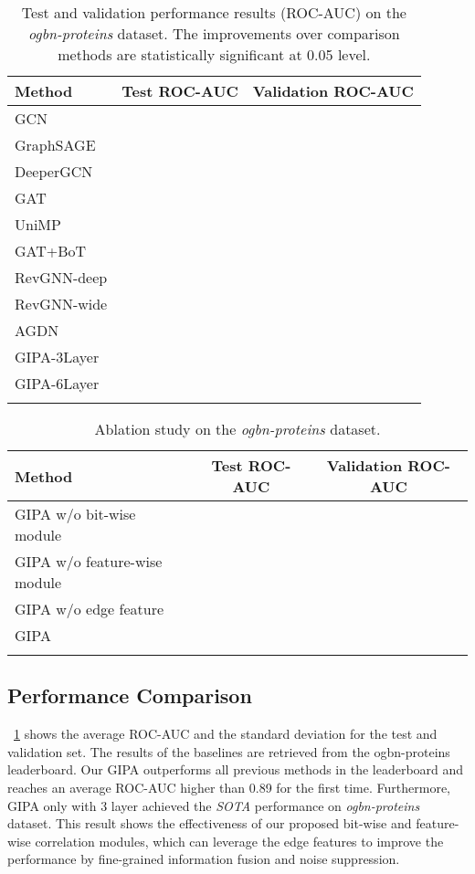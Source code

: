 \documentclass[runningheads]{llncs}
\newcommand{\model}{GIPA\xspace}
\begin{document}
\begin{table}[!h]
\centering
\caption{Test and validation performance results (ROC-AUC) on the \textit{ogbn-proteins} dataset. The improvements over comparison methods are statistically significant at 0.05 level.}
\begin{tabular}{lcc}
\hline
Method              & Test ROC-AUC  & Validation ROC-AUC \\ \hline
GCN                 &  &       \\
GraphSAGE           &  &       \\
DeeperGCN           &  &       \\
GAT                 &  &       \\
UniMP               &  &       \\
GAT+BoT  &  &       \\
RevGNN-deep &  &       \\
RevGNN-wide &  &       \\
AGDN &  &       \\
\hline
\model-3Layer &  &       \\
\model-6Layer      &  &       \\ \hline
\label{tab:performance}
\end{tabular}
\vspace{-0.7cm}
\end{table}
\begin{table}[!h]
\centering
\caption{Ablation study on the \textit{ogbn-proteins} dataset.}
\begin{tabular}{lcc}
\hline
Method              & Test ROC-AUC  & Validation ROC-AUC \\ \hline
\model w/o bit-wise module                 &  &       \\
\model w/o feature-wise module         &  &       \\
\model w/o edge feature           &  &       \\
\hline
\model         &  &       \\ \hline
\label{tab:ab_performance}
\end{tabular}
\vspace{-0.3cm}
\end{table}





\subsection{Performance Comparison}
\tablename~\ref{tab:performance} shows the average ROC-AUC and the standard deviation for the test and validation set.
The results of the baselines are retrieved from the ogbn-proteins leaderboard\footnotemark[8]. 
Our \model outperforms all previous methods in the leaderboard and reaches an average ROC-AUC higher than 0.89 for the first time. 
Furthermore, \model only with 3 layer achieved the \textit{SOTA} performance on \textit{ogbn-proteins} dataset.
This result shows the effectiveness of our proposed bit-wise and feature-wise correlation modules, which can leverage the edge features to improve the performance by fine-grained information fusion and noise suppression. 
\end{document}
